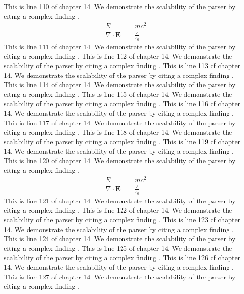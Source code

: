 This is line 110 of chapter 14. We demonstrate the scalability of the parser by citing a complex finding \cite{ref14_110}.
\begin{align*}
  E &= mc^2 \\
  \nabla \cdot \mathbf{E} &= \frac{\rho}{\varepsilon_0}
\end{align*}
This is line 111 of chapter 14. We demonstrate the scalability of the parser by citing a complex finding \cite{ref14_111}.
This is line 112 of chapter 14. We demonstrate the scalability of the parser by citing a complex finding \cite{ref14_112}.
This is line 113 of chapter 14. We demonstrate the scalability of the parser by citing a complex finding \cite{ref14_113}.
This is line 114 of chapter 14. We demonstrate the scalability of the parser by citing a complex finding \cite{ref14_114}.
This is line 115 of chapter 14. We demonstrate the scalability of the parser by citing a complex finding \cite{ref14_115}.
This is line 116 of chapter 14. We demonstrate the scalability of the parser by citing a complex finding \cite{ref14_116}.
This is line 117 of chapter 14. We demonstrate the scalability of the parser by citing a complex finding \cite{ref14_117}.
This is line 118 of chapter 14. We demonstrate the scalability of the parser by citing a complex finding \cite{ref14_118}.
This is line 119 of chapter 14. We demonstrate the scalability of the parser by citing a complex finding \cite{ref14_119}.
This is line 120 of chapter 14. We demonstrate the scalability of the parser by citing a complex finding \cite{ref14_120}.
\begin{align*}
  E &= mc^2 \\
  \nabla \cdot \mathbf{E} &= \frac{\rho}{\varepsilon_0}
\end{align*}
This is line 121 of chapter 14. We demonstrate the scalability of the parser by citing a complex finding \cite{ref14_121}.
This is line 122 of chapter 14. We demonstrate the scalability of the parser by citing a complex finding \cite{ref14_122}.
This is line 123 of chapter 14. We demonstrate the scalability of the parser by citing a complex finding \cite{ref14_123}.
This is line 124 of chapter 14. We demonstrate the scalability of the parser by citing a complex finding \cite{ref14_124}.
This is line 125 of chapter 14. We demonstrate the scalability of the parser by citing a complex finding \cite{ref14_125}.
This is line 126 of chapter 14. We demonstrate the scalability of the parser by citing a complex finding \cite{ref14_126}.
This is line 127 of chapter 14. We demonstrate the scalability of the parser by citing a complex finding \cite{ref14_127}.
